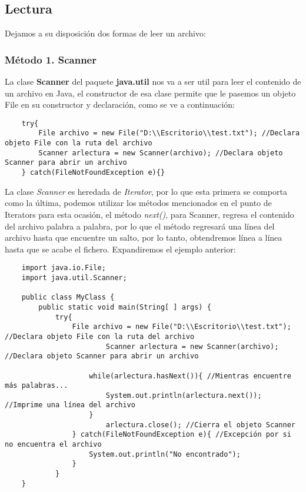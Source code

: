 \subsection{Lectura}
Dejamos a su disposición dos formas de leer un archivo:

\subsubsection{Método 1. Scanner}
La clase \textbf{Scanner} del paquete \textbf{java.util} nos va a ser util para leer el contenido de un archivo en Java, el constructor de esa clase permite que le pasemos un objeto File en su constructor y declaración, como se ve a continuación:
\begin{lstlisting}
    try{
        File archivo = new File("D:\\Escritorio\\test.txt"); //Declara objeto File con la ruta del archivo
        Scanner arlectura = new Scanner(archivo); //Declara objeto Scanner para abrir un archivo
    } catch(FileNotFoundException e){}
\end{lstlisting}
La clase \textit{Scanner} es heredada de \textit{Iterator}, por lo que esta primera se comporta como la última, podemos utilizar los métodos mencionados en el punto de Iterators para esta ocasión, el método \textit{next()}, para Scanner, regresa el contenido del archivo palabra a palabra, por lo que el método regresará una línea del archivo hasta que encuentre un salto, por lo tanto, obtendremos línea a línea hasta que se acabe el fichero. Expandiremos el ejemplo anterior:
\begin{lstlisting}
	import java.io.File;
	import java.util.Scanner;

	public class MyClass {
		public static void main(String[ ] args) {
			try{
				File archivo = new File("D:\\Escritorio\\test.txt"); //Declara objeto File con la ruta del archivo
    		    		Scanner arlectura = new Scanner(archivo); //Declara objeto Scanner para abrir un archivo
        
        			while(arlectura.hasNext()){ //Mientras encuentre más palabras...
            			System.out.println(arlectura.next()); //Imprime una línea del archivo
	        		}
    		    		arlectura.close(); //Cierra el objeto Scanner
    			} catch(FileNotFoundException e){ //Excepción por si no encuentra el archivo
	        		System.out.println("No encontrado");
    			}
	    	}	
	}
\end{lstlisting}


